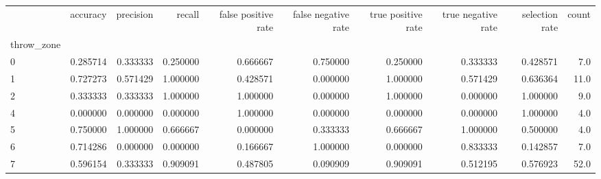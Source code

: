 \begin{tabular}{lrrrrrrrrr}
\toprule
{} &  accuracy &  precision &    recall &  false positive rate &  false negative rate &  true positive rate &  true negative rate &  selection rate &  count \\
throw\_zone &           &            &           &                      &                      &                     &                     &                 &        \\
\midrule
0          &  0.285714 &   0.333333 &  0.250000 &             0.666667 &             0.750000 &            0.250000 &            0.333333 &        0.428571 &    7.0 \\
1          &  0.727273 &   0.571429 &  1.000000 &             0.428571 &             0.000000 &            1.000000 &            0.571429 &        0.636364 &   11.0 \\
2          &  0.333333 &   0.333333 &  1.000000 &             1.000000 &             0.000000 &            1.000000 &            0.000000 &        1.000000 &    9.0 \\
4          &  0.000000 &   0.000000 &  0.000000 &             1.000000 &             0.000000 &            0.000000 &            0.000000 &        1.000000 &    4.0 \\
5          &  0.750000 &   1.000000 &  0.666667 &             0.000000 &             0.333333 &            0.666667 &            1.000000 &        0.500000 &    4.0 \\
6          &  0.714286 &   0.000000 &  0.000000 &             0.166667 &             1.000000 &            0.000000 &            0.833333 &        0.142857 &    7.0 \\
7          &  0.596154 &   0.333333 &  0.909091 &             0.487805 &             0.090909 &            0.909091 &            0.512195 &        0.576923 &   52.0 \\
\bottomrule
\end{tabular}

